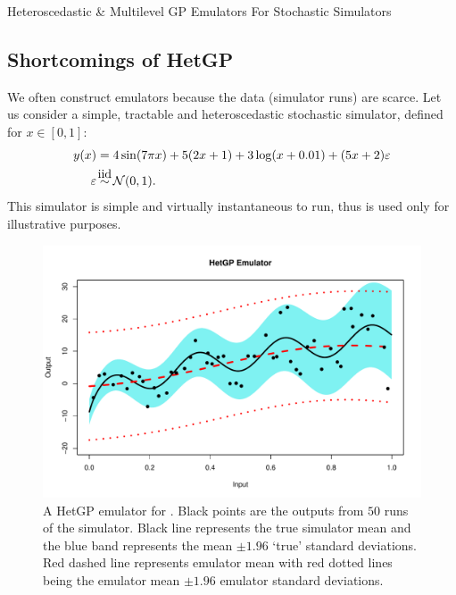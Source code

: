 \begin{chapter}{Heteroscedastic \& Multilevel GP Emulators For Stochastic Simulators\label{Ch:Hetsml}}
\subsection{Shortcomings of HetGP \label{hetgp-shortcomings}}
We often construct emulators because the data (simulator runs) are scarce. Let us consider a simple, tractable and heteroscedastic stochastic simulator, defined for $x \in [0,1]$:
\begin{align}
	y(x) &= 4\sin(7 \pi x) + 5(2x + 1) + 3 \log (x + 0.01) + (5x + 2)\varepsilon\label{Eq:toy-stoch}\\
	\varepsilon &\iid \mathcal{N}(0,1).
\end{align}
This simulator is simple and virtually instantaneous to run, thus is used only for illustrative purposes.
\begin{figure}[ht]
	\centering
	\includegraphics[width=\textwidth]{sml-het-fig2/toy-hgp.pdf}
	\caption{A HetGP emulator for . Black points are the outputs from $50$ runs of the simulator. Black line represents the true simulator mean and the blue band represents the mean $\pm 1.96$ `true' standard deviations. Red dashed line represents emulator mean with red dotted lines being the emulator mean $\pm 1.96$ emulator standard deviations. 	\label{Fig:toy-HetGP}}
\end{figure}

\end{chapter}
